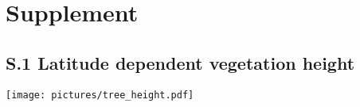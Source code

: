 \documentclass[manuscript]{copernicus}
\begin{document}
\clearpage
\setcounter{page}{1}

\section*{Supplement}
\subsection*{S.1 Latitude dependent vegetation height}
\begin{center}
  \texttt{[image: pictures/tree\_height.pdf]}
\end{center}
\end{document}
